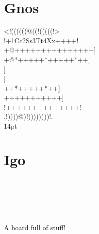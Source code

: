 \documentclass{article}
\begin{document}
\newpage
\begin{center}
\section*{Gnos}
{
{
\gnos%
<!((((((@((!(((((!>\\
!+1Cc2Ss3Tt4Xx++++!\\
+@+++++++++++++++]\\
+@*+++++*+++++*++]\\}
{\gnosb{}}{\gnos]\\}
{\gnosw{}}{\gnos]\\
++*{\gnoswi{}}{\gnoswii{}}{\gnoswiii{}}{\gnosbi{}}{\gnosbii{}}{\gnosbiii{}}+++++*++]\\
++++{\gnoswl{}}{\gnosbl{}}+++++++]\\
!++++++++++++++!\\
,!))))@)!))))))))!.\\
}}
14pt

\section*{Igo}

{\jigogoban
{\jigofont%
\\
{\jigofontwi{}}\\
\\
\\
}
}


A board full of stuff!
\end{center}
\end{document}
